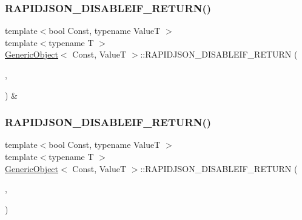 \subsubsection{\texorpdfstring{R\+A\+P\+I\+D\+J\+S\+O\+N\+\_\+\+D\+I\+S\+A\+B\+L\+E\+I\+F\+\_\+\+R\+E\+T\+U\+R\+N()}{RAPIDJSON\_DISABLEIF\_RETURN()}\hspace{0.1cm}{\footnotesize\ttfamily [1/2]}}
{\footnotesize\ttfamily template$<$bool Const, typename ValueT $>$ \\
template$<$typename T $>$ \\
\hyperlink{classGenericObject}{Generic\+Object}$<$ Const, ValueT $>$\+::R\+A\+P\+I\+D\+J\+S\+O\+N\+\_\+\+D\+I\+S\+A\+B\+L\+E\+I\+F\+\_\+\+R\+E\+T\+U\+RN (\begin{DoxyParamCaption}\item[{(internal\+::\+Or\+Expr$<$ internal\+::\+Is\+Pointer$<$ T $>$, \hyperlink{structinternal_1_1IsGenericValue}{internal\+::\+Is\+Generic\+Value}$<$ T $>$ $>$)}]{,  }\item[{(\hyperlink{classGenericObject_a930aa30f89caee7ba7bff60bf9dc21b1}{Value\+Type} \&)}]{ }\end{DoxyParamCaption}) \&}

\mbox{\label{classGenericObject_af361a4b677882964789201fc605541d0}} 
\subsubsection{\texorpdfstring{R\+A\+P\+I\+D\+J\+S\+O\+N\+\_\+\+D\+I\+S\+A\+B\+L\+E\+I\+F\+\_\+\+R\+E\+T\+U\+R\+N()}{RAPIDJSON\_DISABLEIF\_RETURN()}\hspace{0.1cm}{\footnotesize\ttfamily [2/2]}}
{\footnotesize\ttfamily template$<$bool Const, typename ValueT $>$ \\
template$<$typename T $>$ \\
\hyperlink{classGenericObject}{Generic\+Object}$<$ Const, ValueT $>$\+::R\+A\+P\+I\+D\+J\+S\+O\+N\+\_\+\+D\+I\+S\+A\+B\+L\+E\+I\+F\+\_\+\+R\+E\+T\+U\+RN (\begin{DoxyParamCaption}\item[{(internal\+::\+Or\+Expr$<$ internal\+::\+Is\+Pointer$<$ T $>$, \hyperlink{structinternal_1_1IsGenericValue}{internal\+::\+Is\+Generic\+Value}$<$ T $>$ $>$)}]{,  }\item[{(\hyperlink{classGenericObject}{Generic\+Object}$<$ Const, ValueT $>$)}]{ }\end{DoxyParamCaption})}

